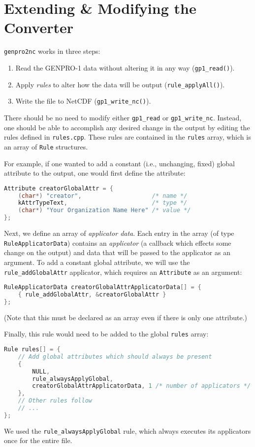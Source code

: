 \documentclass{report}
\begin{document}
\section{Extending \& Modifying the Converter} \label{Sec.Extending}

\texttt{genpro2nc} works in three steps:
\begin{enumerate}[noitemsep]
	\item Read the GENPRO-1 data without altering it in any way (\texttt{gp1\_read()}).
	\item Apply \textit{rules} to alter how the data will be output (\texttt{rule\_applyAll()}).
	\item Write the file to NetCDF (\texttt{gp1\_write\_nc()}).
\end{enumerate}

There should be no need to modify either \texttt{gp1\_read} or \texttt{gp1\_write\_nc}. Instead, one should be able to accomplish any desired change in the output by editing the rules defined in \texttt{rules.cpp}. These rules are contained in the \texttt{rules} array, which is an array of \texttt{Rule} structures.

For example, if one wanted to add a constant (i.e., unchanging, fixed) global attribute to the output, one would first define the attribute:
\begin{lstlisting}[language=c]
Attribute creatorGlobalAttr = {
	(char*) "creator",                    /* name */
	kAttrTypeText,                        /* type */
	(char*) "Your Organization Name Here" /* value */
};
\end{lstlisting}

Next, we define an array of \textit{applicator data}. Each entry in the array (of type \texttt{RuleApplicatorData}) contains an \textit{applicator} (a callback which effects some change on the output) and data that will be passed to the applicator as an argument. To add a constant global attribute, we will use the \texttt{rule\_addGlobalAttr} applicator, which requires an \texttt{Attribute} as an argument:

\begin{lstlisting}[language=c]
RuleApplicatorData creatorGlobalAttrApplicatorData[] = {
    { rule_addGlobalAttr, &creatorGlobalAttr }
};
\end{lstlisting}

(Note that this must be declared as an array even if there is only one attribute.)

Finally, this rule would need to be added to the global \texttt{rules} array:
\begin{lstlisting}[language=c]
Rule rules[] = {
    // Add global attributes which should always be present
    {
        NULL,
        rule_alwaysApplyGlobal,
        creatorGlobalAttrApplicatorData, 1 /* number of applicators */
    },
    // Other rules follow
    // ...
};
\end{lstlisting}

We used the \texttt{rule\_alwaysApplyGlobal} rule, which always executes its applicators once for the entire file.

\nocite{*}
% 
% 

\end{document}

